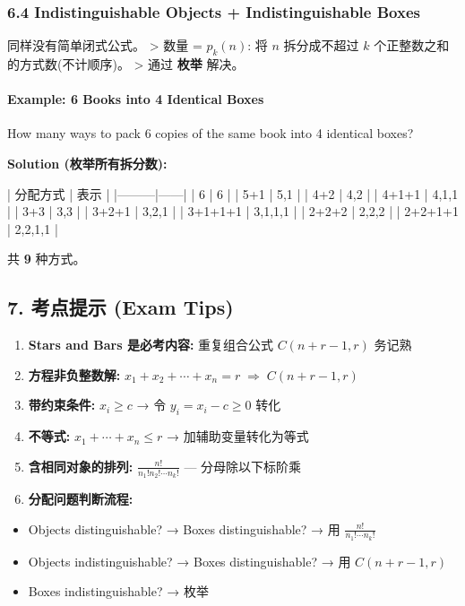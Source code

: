 \documentclass[10pt,a4paper,openany]{ctexbook}
\theoremstyle{definition}
\theoremstyle{remark}
\renewenvironment{quote}
  {\list{}{\leftmargin=1em\rightmargin=0pt\topsep=0.5pt\partopsep=0pt}\item[]}
  {\endlist}
\begin{document}
\subsubsection{6.4 Indistinguishable Objects + Indistinguishable Boxes}

\begin{quote}
同样没有简单闭式公式。
>
数量 = $p_k(n)$: 将 $n$ 拆分成不超过 $k$ 个正整数之和的方式数(不计顺序)。
>
通过 \textbf{枚举} 解决。

\end{quote}

\paragraph{Example: 6 Books into 4 Identical Boxes}

\begin{quote}
How many ways to pack 6 copies of the same book into 4 identical boxes?

\textbf{Solution (枚举所有拆分数):}

| 分配方式 | 表示 |
|---------|------|
| 6 | 6 |
| 5+1 | 5,1 |
| 4+2 | 4,2 |
| 4+1+1 | 4,1,1 |
| 3+3 | 3,3 |
| 3+2+1 | 3,2,1 |
| 3+1+1+1 | 3,1,1,1 |
| 2+2+2 | 2,2,2 |
| 2+2+1+1 | 2,2,1,1 |

共 \textbf{9} 种方式。

\end{quote}
\vspace{-2pt}

\subsection{7. 考点提示 (Exam Tips)}

\begin{enumerate}
\item \textbf{Stars and Bars 是必考内容:} 重复组合公式 $C(n+r-1, r)$ 务记熟
\item \textbf{方程非负整数解:} $x_1 + x_2 + \cdots + x_n = r \;\Rightarrow\; C(n+r-1, r)$
\item \textbf{带约束条件:} $x_i \ge c$ → 令 $y_i = x_i - c \ge 0$ 转化
\item \textbf{不等式:} $x_1 + \cdots + x_n \le r$ → 加辅助变量转化为等式
\item \textbf{含相同对象的排列:} $\frac{n!}{n_1! n_2! \cdots n_k!}$ — 分母除以下标阶乘
\item \textbf{分配问题判断流程:}
\end{enumerate}

\begin{itemize}
\item Objects distinguishable? → Boxes distinguishable? → 用 $\frac{n!}{n_1!\cdots n_k!}$
\item Objects indistinguishable? → Boxes distinguishable? → 用 $C(n+r-1, r)$
\item Boxes indistinguishable? → 枚举

\end{itemize}
\end{document}
